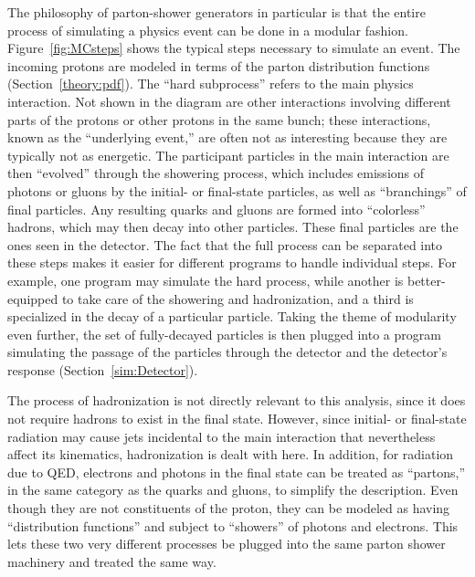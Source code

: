 The philosophy of parton-shower generators 
in particular 
is that the entire process of simulating 
a physics event can be done in a modular fashion.  
Figure~\ref{fig:MCsteps} 
shows the typical steps necessary to simulate an event.  
The incoming protons are modeled in terms of the 
parton distribution functions (Section~\ref{theory:pdf}).  
The ``hard subprocess'' refers to the main 
physics interaction.  
Not shown in the diagram are other interactions 
involving different parts of the protons 
or other protons in the same bunch; 
these interactions, known as the ``underlying event,''  
are often not as interesting 
because they are typically not as energetic.  
The participant particles in the main interaction 
are then ``evolved'' through the showering process, 
which includes emissions of photons or gluons 
by the initial- or final-state particles, 
as well as ``branchings'' of final particles. %
Any resulting quarks and gluons are 
formed into ``colorless'' hadrons, %
which may then decay into other particles. 
These final particles are the ones seen 
in the detector.  
The fact that the full process can be separated 
into these steps 
makes it easier for different programs 
to handle individual steps.  
For example, one program may simulate the 
hard process, 
while another is better-equipped to take care 
of the showering and hadronization, 
and a third is specialized in the decay of 
a particular particle.  
Taking the theme of modularity even further, 
the set of fully-decayed particles 
is then plugged into a program simulating 
the passage of the particles through the detector 
and the detector's response (Section~\ref{sim:Detector}).  

The process of hadronization is not directly 
relevant to this analysis, 
since it does not require hadrons to 
exist in the final state.  
However, since initial- or final-state radiation 
may cause jets incidental to the main interaction 
that nevertheless affect its kinematics, 
hadronization is dealt with here.  
In addition, 
for radiation due to QED, 
electrons and photons in the final state 
can be treated as ``partons,'' 
in the same category as the quarks and gluons, 
to simplify the description.  
Even though they are not constituents of the proton, 
they can be modeled as having 
``distribution functions'' 
and subject to ``showers'' of 
photons and electrons. 
This lets these two very different processes be 
plugged into the same parton shower machinery 
and treated the same way.  

